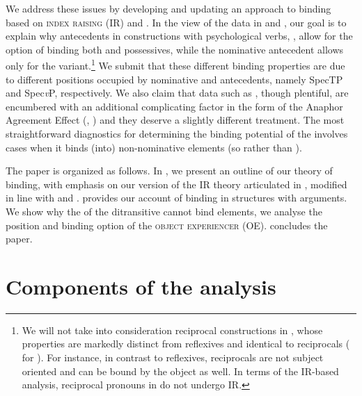 \documentclass[output=paper,nonflat,colorlinks,citecolor=brown,newtxmath]{langsci/langscibook}
\begin{document}
\noindent We address these issues by developing and updating an approach to binding based on  \textsc{index raising} (IR) and \cite{despic2013,despic2015}. In the view of the data in  and , our goal is to explain why  antecedents in constructions with psychological verbs, , allow for the option of binding both  and  possessives, while the nominative antecedent allows only for the  variant.\footnote{\label{fn2}We will not take into consideration reciprocal constructions in , whose properties are markedly distinct from reflexives and identical to  reciprocals (\citealt{willim1989,reinders1991,rappaport1986} for ). For instance, in contrast to reflexives, reciprocals are not subject oriented and can be bound by the object as well. In terms of the IR-based analysis, reciprocal pronouns in  do not undergo IR.} We submit that these different binding properties are due to different positions occupied by nominative and  antecedents, namely SpecTP and Spec\textit{v}P, respectively. We also claim that data such as , though plentiful, are encumbered with an additional complicating factor in the form of the Anaphor Agreement Effect (, \citealt{rizzi1990,progovac1992,progovac1993,woolford1999,reuland2011}) and they deserve a slightly different treatment. The most straightforward diagnostics for determining the binding potential of the  involves cases when it binds (into) non-nominative elements (so  rather than ).

The paper is organized as follows. In , we present an outline of our theory of binding, with emphasis on our version of the IR theory articulated in \cite{nikolaeva2014}, modified in line with \cite{boskovic2005locality,boskovic2012,boskovic2013,boskovic2014} and \cite{despic2011,despic2013,despic2015}.  provides our account of binding in structures with  arguments. We show why the  of the ditransitive  cannot bind  elements, we analyse the position and binding option of the  \textsc{object experiencer} (OE).  concludes the paper.

\section{Components of the analysis} \label{sec:witkos:s2}
\end{document}
